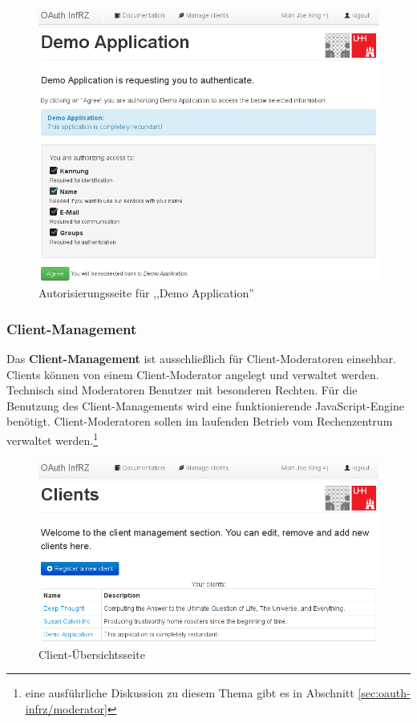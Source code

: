 \documentclass[12pt,a4paper,pointednumbers,abstracton]{scrartcl}
\begin{document}
\begin{figure}[h!]
\centering
\includegraphics[width=15cm]{img/oauth_infrz/authorize}
\caption{Autorisierungsseite für ,,Demo Application''}
\label{pic:oauth_infrz/authorize}
\end{figure}

\subsubsection{Client-Management}

Das \textbf{Client-Management} ist ausschließlich für Client-Moderatoren einsehbar.
Clients können von einem Client-Moderator angelegt und verwaltet werden.
Technisch sind Moderatoren Benutzer mit besonderen Rechten.
Für die Benutzung des Client-Managements wird eine funktionierende JavaScript-Engine benötigt.
Client-Moderatoren sollen im laufenden Betrieb vom Rechenzentrum verwaltet werden.\footnote{eine ausführliche Diskussion zu diesem Thema gibt es in Abschnitt \ref{sec:oauth-infrz/moderator}}


\begin{figure}[h!]
\centering
\includegraphics[width=15cm]{img/oauth_infrz/clients_overview}
\caption{Client-Übersichtsseite}
\label{pic:oauth_infrz/clients_overview}
\end{figure}
\end{document}
